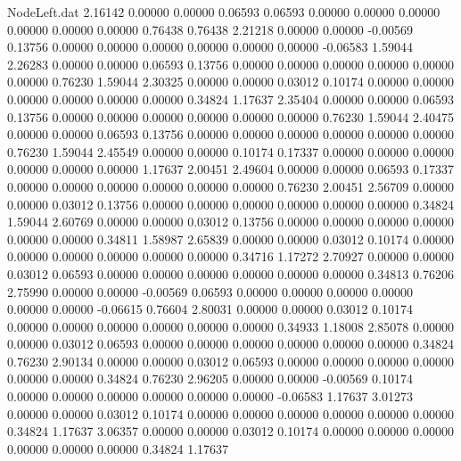 \begin{filecontents}{NodeLeft.dat}
   2.16142    0.00000    0.00000     0.06593    0.06593    0.00000    0.00000    0.00000    0.00000    0.00000    0.00000    0.76438    0.76438
   2.21218    0.00000    0.00000    -0.00569    0.13756    0.00000    0.00000    0.00000    0.00000    0.00000    0.00000   -0.06583    1.59044
   2.26283    0.00000    0.00000     0.06593    0.13756    0.00000    0.00000    0.00000    0.00000    0.00000    0.00000    0.76230    1.59044
   2.30325    0.00000    0.00000     0.03012    0.10174    0.00000    0.00000    0.00000    0.00000    0.00000    0.00000    0.34824    1.17637
   2.35404    0.00000    0.00000     0.06593    0.13756    0.00000    0.00000    0.00000    0.00000    0.00000    0.00000    0.76230    1.59044
   2.40475    0.00000    0.00000     0.06593    0.13756    0.00000    0.00000    0.00000    0.00000    0.00000    0.00000    0.76230    1.59044
   2.45549    0.00000    0.00000     0.10174    0.17337    0.00000    0.00000    0.00000    0.00000    0.00000    0.00000    1.17637    2.00451
   2.49604    0.00000    0.00000     0.06593    0.17337    0.00000    0.00000    0.00000    0.00000    0.00000    0.00000    0.76230    2.00451
   2.56709    0.00000    0.00000     0.03012    0.13756    0.00000    0.00000    0.00000    0.00000    0.00000    0.00000    0.34824    1.59044
   2.60769    0.00000    0.00000     0.03012    0.13756    0.00000    0.00000    0.00000    0.00000    0.00000    0.00000    0.34811    1.58987
   2.65839    0.00000    0.00000     0.03012    0.10174    0.00000    0.00000    0.00000    0.00000    0.00000    0.00000    0.34716    1.17272
   2.70927    0.00000    0.00000     0.03012    0.06593    0.00000    0.00000    0.00000    0.00000    0.00000    0.00000    0.34813    0.76206
   2.75990    0.00000    0.00000    -0.00569    0.06593    0.00000    0.00000    0.00000    0.00000    0.00000    0.00000   -0.06615    0.76604
   2.80031    0.00000    0.00000     0.03012    0.10174    0.00000    0.00000    0.00000    0.00000    0.00000    0.00000    0.34933    1.18008
   2.85078    0.00000    0.00000     0.03012    0.06593    0.00000    0.00000    0.00000    0.00000    0.00000    0.00000    0.34824    0.76230
   2.90134    0.00000    0.00000     0.03012    0.06593    0.00000    0.00000    0.00000    0.00000    0.00000    0.00000    0.34824    0.76230
   2.96205    0.00000    0.00000    -0.00569    0.10174    0.00000    0.00000    0.00000    0.00000    0.00000    0.00000   -0.06583    1.17637
   3.01273    0.00000    0.00000     0.03012    0.10174    0.00000    0.00000    0.00000    0.00000    0.00000    0.00000    0.34824    1.17637
   3.06357    0.00000    0.00000     0.03012    0.10174    0.00000    0.00000    0.00000    0.00000    0.00000    0.00000    0.34824    1.17637

\end{filecontents}
